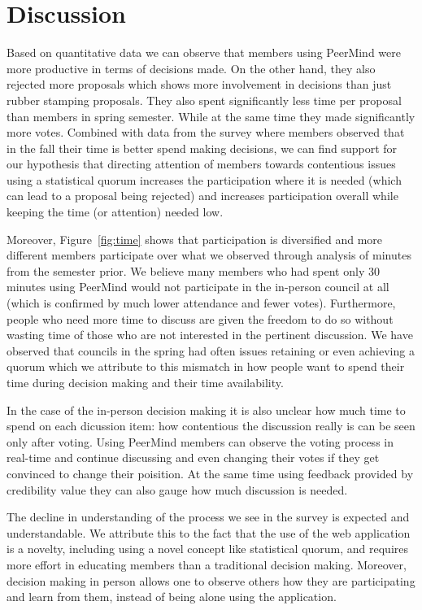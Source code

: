 \documentclass[format=acmsmall, review=true, screen=true, anonymous=true]{acmart}
\begin{document}
\section{Discussion}
\label{sec:discussion}

Based on quantitative data we can observe that members using PeerMind were more productive in
terms of decisions made.
On the other hand, they also rejected more proposals which shows more involvement in decisions
than just rubber stamping proposals.
They also spent significantly less time per proposal than members in spring semester.
While at the same time they made significantly more votes.
Combined with data from the survey where members observed that in the fall their time
is better spend making decisions, we can find support for our hypothesis that directing
attention of members towards contentious issues using a statistical quorum increases the
participation where it is needed (which can lead to a proposal being rejected) and
increases participation overall while keeping the time (or attention) needed low.

Moreover, Figure~\ref{fig:time} shows that participation is diversified and more different
members participate over what we observed through analysis of minutes from the semester prior.
We believe many members who had spent only 30 minutes using PeerMind would not participate
in the in-person council at all (which is confirmed by much lower attendance and fewer votes).
Furthermore, people who need more time to discuss are given the freedom to do so without wasting
time of those who are not interested in the pertinent discussion.
We have observed that councils in the spring had often issues retaining or even achieving a
quorum which we attribute to this mismatch in how people want to spend their time during
decision making and their time availability.

In the case of the in-person decision making it is also unclear how much time to spend on each
dicussion item: how contentious the discussion really is can be seen only after voting.
Using PeerMind members can observe the voting process in real-time and continue discussing
and even changing their votes if they get convinced to change their poisition.
At the same time using feedback provided by credibility value they can also gauge how
much discussion is needed.


The decline in understanding of the process we see in the survey is expected and understandable.
We attribute this to the fact that the use of the web application is
a novelty, including using a novel concept like statistical quorum, and requires more effort
in educating members than a traditional decision making.
Moreover, decision making in person allows one to observe others how they are participating and
learn from them, instead of being alone using the application.
\end{document}

